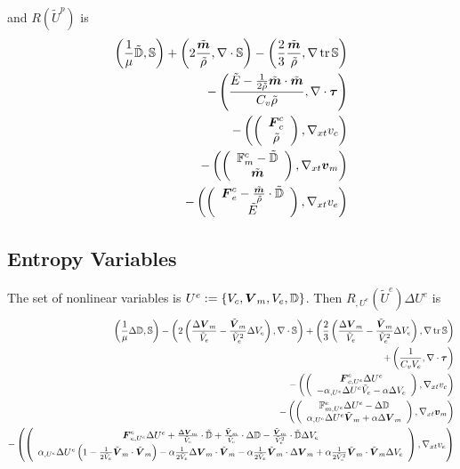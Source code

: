 \documentclass{article}
\begin{document}
and $R(\tilde U^p)$ is
\begin{align*}
	\left( \frac{1}{\mu}\tilde{\mathbb{D}},\mathbb{S} \right)+\left( 2\frac{\tilde{\boldsymbol m}}{\tilde\rho},\nabla\cdot\mathbb{S} \right)
	-\left( \frac{2}{3}\frac{\tilde{\boldsymbol m}}{\tilde\rho},\nabla\operatorname*{tr}{\mathbb{S}} \right)\\
	-\left( \frac{\tilde E-\frac{1}{2\tilde\rho}\tilde{\boldsymbol m}\cdot\tilde{\boldsymbol m}}{C_v\tilde\rho},\nabla\cdot\boldsymbol\tau \right)\\
	-\left( \left( \begin{array}{c} \boldsymbol F^c_c\\ \tilde\rho\\ \end{array} \right),\nabla_{xt} v_c \right)\\
	-\left( \left( \begin{array}{c} \mathbb{F}^c_m-\tilde{\mathbb{D}}\\ \tilde{\boldsymbol m}\\ \end{array} \right),\nabla_{xt}\boldsymbol v_m \right)\\
	-\left( \left( \begin{array}{c} \boldsymbol F^c_e-\frac{\tilde{\boldsymbol m}}{\tilde\rho}\cdot\tilde{\mathbb{D}}\\ \tilde E\\ \end{array} \right),\nabla_{xt} v_e \right)
\end{align*}

\subsection*{Entropy Variables}
The set of nonlinear variables is $U^e:=\left\{ V_c,\boldsymbol V_m,V_e,\mathbb{D} \right\}$.
Then $R_{,U^e}(\tilde U^e)\Delta U^e$ is
\begin{align*}
	\left( \frac{1}{\mu}\Delta\mathbb{D},\mathbb{S} \right)
	-\left( 2\left( \frac{\Delta\boldsymbol V_m}{\tilde V_e}-\frac{\tilde{\boldsymbol V}_m}{\tilde V_e^2}\Delta V_e \right),\nabla\cdot\mathbb{S} \right)
	+\left( \frac{2}{3}\left( \frac{\Delta\boldsymbol V_m}{\tilde V_e}-\frac{\tilde{\boldsymbol V}_m}{\tilde V_e^2}\Delta V_e \right),\nabla\operatorname*{tr}{\mathbb{S}} \right)\\
	+\left( \frac{1}{C_vV_e},\nabla\cdot\boldsymbol\tau \right)\\
	-\left( \left( \begin{array}{c} \boldsymbol F^e_{c,U^e}\Delta U^e\\ -\alpha_{,U^e}\Delta U^e \tilde V_e-\alpha\Delta V_e\\ \end{array} \right),\nabla_{xt} v_c \right)\\
	-\left( \left( \begin{array}{c} \mathbb{F}^e_{m,U^e}\Delta U^e-\Delta\mathbb{D}\\ \alpha_{,U^e}\Delta U^e\tilde{\boldsymbol V}_m+\alpha\Delta\boldsymbol V_m\\ \end{array} \right),\nabla_{xt}\boldsymbol v_m \right)\\
	-\left( \left( \begin{array}{c} \boldsymbol F^e_{e,U^e}\Delta U^e
	+\frac{\Delta\boldsymbol V_m}{\tilde V_e}\cdot\tilde{\mathbb{D}}
	+\frac{\tilde{\boldsymbol V}_m}{\tilde V_e}\cdot\Delta{\mathbb{D}}
	-\frac{\tilde{\boldsymbol V}_m}{\tilde V_e^2}\cdot\tilde{\mathbb{D}}\Delta V_e
	\\ \alpha_{,U^e}\Delta U^e\left( 1-\frac{1}{2\tilde V_e}\tilde{\boldsymbol V}_m\cdot\tilde{\boldsymbol V}_m \right)
	-\alpha\frac{1}{2\tilde V_e}\Delta\boldsymbol V_m\cdot\tilde{\boldsymbol V}_m
	-\alpha\frac{1}{2\tilde V_e}\tilde{\boldsymbol V}_m\cdot\Delta\boldsymbol V_m
	+\alpha\frac{1}{2\tilde V_e^2}\tilde{\boldsymbol V}_m\cdot\tilde{\boldsymbol V}_m\Delta V_e
	\\ \end{array} \right),\nabla_{xt} v_e \right)
\end{align*}
\end{document}
